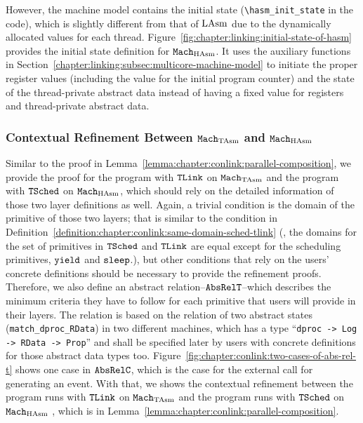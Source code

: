However, the machine model contains the initial state (\lstinline$\hasm_init_state$ in the code),
which is slightly different from that of $\mathrm{LAsm}$ due to the dynamically allocated values for each thread.
Figure~\ref{fig:chapter:linking:initial-state-of-hasm} provides 
the initial state definition for ${\mathrm{\texttt{Mach}}}_{\mathrm{HAsm}}$.
It uses the auxiliary functions in Section~\ref{chapter:linking:subsec:multicore-machine-model} to
initiate the proper register values (including the value for the initial program counter) and the state of the thread-private abstract data instead of having a fixed value for registers and thread-private abstract data.
 
\subsubsection{Contextual Refinement Between ${\mathrm{\texttt{Mach}}}_{\mathrm{TAsm}}$ and ${\mathrm{\texttt{Mach}}}_{\mathrm{HAsm}}$}
 
 
Similar to the proof in Lemma~\ref{lemma:chapter:conlink:parallel-composition}, 
we provide the proof for the program with ${{\mathrm{\texttt{TLink}}}}$ on ${\mathrm{\texttt{Mach}}}_{\mathrm{TAsm}}$ and the program with ${{\mathrm{\texttt{TSched}}}}$ on ${\mathrm{\texttt{Mach}}}_{\mathrm{HAsm}}$,
which should rely on the detailed information of those two layer definitions as well. 
Again, a trivial condition is  the domain of the primitive of those two layers; that is similar to the condition in Definition~\ref{definition:chapter:conlink:same-domain-sched-tlink}
(\ie, the domains for the set of primitives in ${{\mathrm{\texttt{TSched}}}}$ and ${{\mathrm{\texttt{TLink}}}}$ are equal except for the scheduling primitives, ${\mathrm{\texttt{yield}}}$ and ${\mathrm{\texttt{sleep}}}$.),
but other conditions that rely on the users' concrete definitions
should be necessary to provide the refinement proofs.
Therefore, we also define an abstract relation--${{\mathrm{\texttt{AbsRelT}}}}$--which describes the minimum criteria they have to follow for each primitive that users will provide in their layers.
The relation is based on the relation of two abstract states (\lstinline$match_dproc_RData$) in two different machines, which has a
type ``\lstinline$dproc -> Log -> RData -> Prop$'' and shall be specified later by users with  concrete definitions for those abstract data types too. Figure~\ref{fig:chapter:conlink:two-cases-of-abs-rel-t} shows 
one case in  ${{\mathrm{\texttt{AbsRelC}}}}$, which is the case 
for the external call for generating an event. 
With that, we shows the contextual refinement between the program runs with ${{\mathrm{\texttt{TLink}}}}$ on ${\mathrm{\texttt{Mach}}}_{\mathrm{TAsm}}$ and the program runs with ${{\mathrm{\texttt{TSched}}}}$ on ${\mathrm{\texttt{Mach}}}_{\mathrm{HAsm}}$ , which is in Lemma~\ref{lemma:chapter:conlink:parallel-composition}. 

